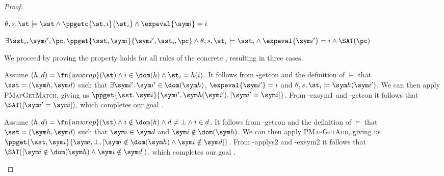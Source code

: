 \begin{proof}


\pfassume \begin{hypvlist}
 $\theta,s,\st \models \sst \land \ppgetc{\st, i}{\st_i} \land \expeval{\sym i}=i$
\end{hypvlist}
\pfprove \begin{goalvlist}
 $\exists \sst_i, \sym i', \pc \ldotp \ppget{\sst,\sym i}{\sym i', \sst_i, \pc} \land \theta,s,\st_i\models\sst_i \land \expeval{\sym i'}=i \land \SAT(\pc)$
\end{goalvlist}

We proceed by proving the property holds for all rules of the concrete , resulting in three cases.


\begin{hypvlist}
 Assume $(h,d)=\fn{unwrap}(\st) \land i\in\dom(h) \land \st_{i}=h(i)$.
 It follows from \hyp{getcon} and the definition of $\models$ that $\sst=(\sym h, \sym d)$ such that $\exists \sym i'\ldotp \sym i' \in \dom(\sym h)$, $\expeval{\sym i'}=i$ and $\theta,s,\st_i\models \sym h(\sym i')$.
 We can then apply \textsc{PMapGetMatch}, giving us $\ppget{\sst,\sym i}{\sym i', \sym h(\sym i'), [\sym i' = \sym i]}$.
 From \hyp{exsym1} and \hyp{getcon} it follows that $\SAT([\sym i'=\sym i])$, which completes our goal .
\end{hypvlist}


\begin{hypvlist}
 Assume $(h,d)=\fn{unwrap}(\st) \land i\notin\dom(h) \land d\neq\bot \land i\in d$.
 It follows from \hyp{getcon} and the definition of $\models$ that $\sst=(\sym h, \sym d)$ such that $\sym i\in \sym d$ and $\sym i\notin \dom(\sym h)$.
 We can then apply \textsc{PMapGetAdd}, giving us $\ppget{\sst,\sym i}{\sym i,\bot,[\sym i\notin \dom(\sym h) \land \sym i\notin \sym d]}$.%
 From \hyp{applys2} and \hyp{exsym2} it follows that $\SAT([\sym i\notin \dom(\sym h) \land \sym i\notin \sym d])$, which completes our goal .
\end{hypvlist}



\end{proof}
